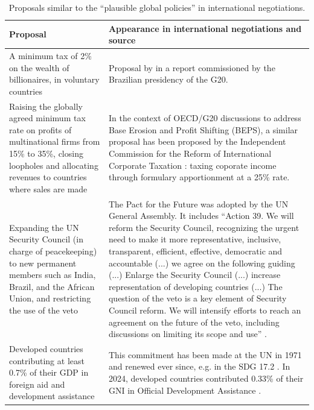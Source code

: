\begin{table}[H]
\caption[Sources for plausible global policies]{Proposals similar to the ``plausible global policies'' in international negotiations.}
\label{tab:plausible_policies}
\begin{tabular}{p{5cm}p{11cm}}
\toprule
Proposal & Appearance in international negotiations and source \\
\midrule
A minimum tax of 2\% on the wealth of billionaires, in voluntary countries  & Proposal by \cite{zucman_blueprint_2024} in a report commissioned by the Brazilian presidency of the G20. \\ \addlinespace 
Raising the globally agreed minimum tax rate on profits of multinational firms from 15\% to 35\%, closing loopholes and allocating revenues to countries where sales are made  & In the context of OECD/G20 discussions to address Base Erosion and Profit Shifting (BEPS), a similar proposal has been proposed by the Independent Commission for the Reform of International Corporate Taxation \citep{icrict_icrict_2020}: taxing coporate income through formulary apportionment at a 25\% rate. \\ \addlinespace 
Expanding the UN Security Council (in charge of peacekeeping) to new permanent members such as India, Brazil, and the African Union, and restricting the use of the veto  & The Pact for the Future was adopted by the UN General Assembly. It includes ``Action 39. We will reform the Security Council, recognizing the urgent need to make it more representative, inclusive, transparent, efficient, effective, democratic and accountable (...) we agree on the following guiding (...) Enlarge the Security Council (...) increase representation of developing countries (...) The question of the veto is a key element of Security Council reform. We will intensify efforts to reach an agreement on the future of the veto, including discussions on limiting its scope and use'' \citep{un_pact_2024}.  \\ \addlinespace 
Developed countries contributing at least 0.7\% of their GDP in foreign aid and development assistance  & This commitment has been made at the UN in 1971 and renewed ever since, e.g. in the SDG 17.2 \citep{unga_declaration_1971,un_sustainable_2017}. In 2024, developed countries contributed 0.33\% of their GNI in Official Development Assistance \citep{oecd_preliminary_2025}. \\ 

\end{tabular}
\end{table}
